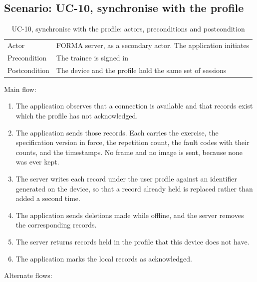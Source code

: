 \subsection{Scenario: UC-10, synchronise with the profile}
\label{sec:3.2.4}

{\small
\setlength{\LTpre}{6pt}\setlength{\LTpost}{8pt}
\begin{longtable}{>{\raggedright\arraybackslash}p{}>{\raggedright\arraybackslash}p{}}
\caption{UC-10, synchronise with the profile: actors, preconditions and postcondition}\\
\toprule
\endfirsthead
\endhead
\bottomrule
\endlastfoot
Actor & FORMA server, as a secondary actor. The application initiates \\
Precondition & The trainee is signed in \\
Postcondition & The device and the profile hold the same set of sessions \\
\end{longtable}
}

Main flow:

\begin{enumerate}
\item The application observes that a connection is available and that records exist which the profile has not acknowledged.
\item The application sends those records. Each carries the exercise, the specification version in force, the repetition count, the fault codes with their counts, and the timestamps. No frame and no image is sent, because none was ever kept.
\item The server writes each record under the user profile against an identifier generated on the device, so that a record already held is replaced rather than added a second time.
\item The application sends deletions made while offline, and the server removes the corresponding records.
\item The server returns records held in the profile that this device does not have.
\item The application marks the local records as acknowledged.
\end{enumerate}

Alternate flows:

